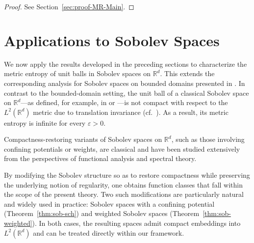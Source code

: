 \documentclass[a4paper,12pt]{article}
\newcommand{\R}{\mathbb{R}}
\begin{document}
\begin{proof}
See Section~\ref{sec:proof-MR-Main}.
\end{proof}






\section{Applications to Sobolev Spaces}\label{sec:appli-sobolev-spaces}

We now apply the results developed in the preceding sections to characterize the
metric entropy of unit balls in Sobolev spaces on $\R^d$. This extends the
corresponding analysis for Sobolev spaces on bounded domains presented in
\cite[Section~3.2]{ab2025compactoperators}. In contrast to the bounded-domain
setting, the unit ball of a classical Sobolev space on $\R^d$—as defined, for
example, in \cite[Definition~3.1]{Taylor+1981} or
\cite[Section~9.1]{brezisFunctionalAnalysisSobolev2011}—is not compact with
respect to the $L^2(\R^d)$ metric due to translation invariance
(cf.\ \cite[Example~6.11]{adamsSobolevSpaces2003}). As a result, its metric
entropy is infinite for every $\varepsilon>0$.

Compactness-restoring variants of Sobolev spaces on $\R^d$, such as those
involving confining potentials or weights, are classical and have been studied
extensively from the perspectives of functional analysis and spectral theory.

By modifying the Sobolev structure so as to restore compactness while
preserving the underlying notion of regularity, one obtains function classes
that fall within the scope of the present theory. Two such modifications are
particularly natural and widely used in practice: Sobolev spaces with a
confining potential (Theorem~\ref{thm:sob-sch}) and weighted Sobolev spaces
(Theorem~\ref{thm:sob-weighted}). In both cases, the resulting spaces admit
compact embeddings into $L^2(\R^d)$ and can be treated directly within our framework.


\end{document}
